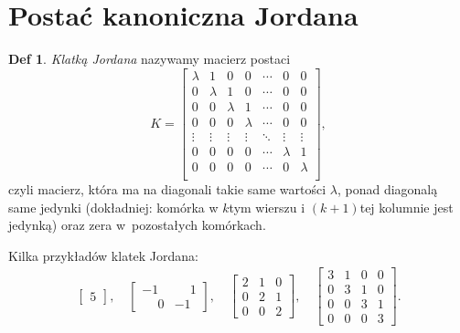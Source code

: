 \documentclass[a4paper, 12pt]{mwart}
\theoremstyle{definition}
\newtheorem{definicja}{Def}[section]
\theoremstyle{plain}
\theoremstyle{remark}
\begin{document}
\section{Postać kanoniczna Jordana}
\begin{definicja}
	\emph{Klatką Jordana} nazywamy macierz postaci
	\begin{equation}
		K = \begin{bmatrix}
			\lambda & 1 & 0 & 0 & \cdots & 0 & 0 \\
			0 & \lambda & 1 & 0 & \cdots & 0 & 0 \\
			0 & 0 & \lambda & 1 & \cdots & 0 & 0 \\
			0 & 0 & 0 & \lambda & \cdots & 0 & 0 \\
			\vdots & \vdots & \vdots & \vdots & \ddots & \vdots & \vdots \\
			0 & 0 & 0 & 0 & \cdots & \lambda & 1 \\
			0 & 0 & 0 & 0 & \cdots & 0 & \lambda \\
		\end{bmatrix},
	\end{equation}
	czyli macierz, która ma na diagonali takie same wartości $\lambda$, ponad diagonalą same jedynki (dokładniej: komórka w $k$\dywiz tym wierszu i $(k+1)$\dywiz tej kolumnie jest jedynką) oraz zera w~pozostałych komórkach.
\end{definicja}
Kilka przykładów klatek Jordana:
\begin{gather}
	\begin{bmatrix}
		5
	\end{bmatrix},\quad
	\begin{bmatrix}
		-1 & \phantom{-}1 \\
		\phantom{-}0 & -1
	\end{bmatrix},\quad
	\begin{bmatrix}
		2 & 1 & 0 \\
		0 & 2 & 1 \\
		0 & 0 & 2
	\end{bmatrix},\quad
	\begin{bmatrix}
		3 & 1 & 0 & 0 \\
		0 & 3 & 1 & 0 \\
		0 & 0 & 3 & 1 \\
		0 & 0 & 0 & 3
	\end{bmatrix}.
\end{gather}
\end{document}
